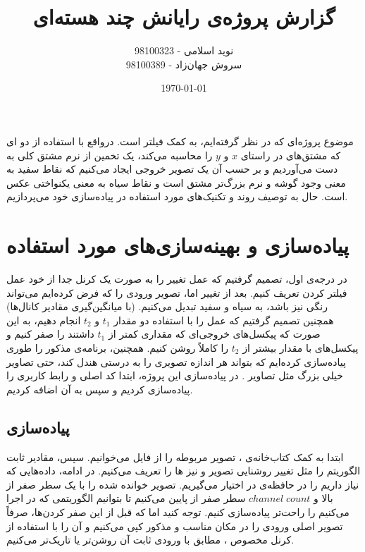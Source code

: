 \documentclass[12pt,onecolumn,a4paper]{article}
\begin{document}
\begin{titlepage}
\title{گزارش پروژه‌ی رایانش چند هسته‌ای \\ } 
\author{نوید اسلامی - 98100323 \\ سروش جهان‌زاد - 98100389}
\date{\today}
\maketitle
\end{titlepage}

موضوع پروژه‌ای که در نظر گرفته‌ایم،  به کمک فیلتر  است. درواقع با استفاده از دو ای که مشتق‌های در راستای $x$ و $y$ را محاسبه می‌کند، یک تخمین از نرم مشتق کلی به دست می‌آوردیم و بر حسب آن یک تصویر خروجی ایجاد می‌کنیم که نقاط سفید به معنی وجود گوشه و نرم بزرگ‌تر مشتق است و نقاط سیاه به معنی یکنواختی عکس است. حال به توصیف روند و تکنیک‌های مورد استفاده در پیاده‌سازی خود می‌پردازیم.

\section{پیاده‌سازی و بهینه‌سازی‌های مورد استفاده}
در درجه‌ی اول، تصمیم گرفتیم که عمل تغییر  را به صورت یک کرنل جدا از خود عمل فیلتر کردن تعریف کنیم. بعد از تغییر  اما، تصویر ورودی را که فرض کرده‌ایم می‌تواند رنگی نیز باشد، به سیاه و سفید تبدیل می‌کنیم. (با میانگین‌گیری مقادیر کانال‌ها) همچنین تصمیم گرفتیم که عمل  را با استفاده دو مقدار  $t_1$ و $t_2$ انجام دهیم، به این صورت که پیکسل‌های خروجی‌ای که مقداری کمتر از $t_1$ داشتند را صفر کنیم و پیکسل‌های با مقدار بیشتر از $t_2$ را کاملاً روشن کنیم. همچنین، برنامه‌ی مذکور را طوری پیاده‌سازی کرده‌ایم که بتواند هر اندازه تصویری را به درستی هندل کند، حتی تصاویر خیلی بزرگ مثل تصاویر . در پیاده‌سازی این پروژه، ابتدا کد اصلی و رابط کاربری  را پیاده‌سازی کردیم و سپس به آن  اضافه کردیم.

\subsection{پیاده‌سازی }
ابتدا به کمک کتاب‌خانه‌ی ، تصویر مربوطه را از فایل می‌خوانیم. سپس، مقادیر ثابت الگوریتم را مثل تغییر روشنایی تصویر و نیز ها را تعریف می‌کنیم. در ادامه، داده‌هایی که نیاز داریم را در حافظه‌ی  در اختیار می‌گیریم. تصویر خوانده شده را با یک سطر صفر از بالا و $channel \; count$ سطر صفر از پایین  می‌کنیم تا بتوانیم الگوریتمی که در  اجرا می‌کنیم را راحت‌تر پیاده‌سازی کنیم. توجه کنید اما که قبل از این صفر کردن‌ها، صرفاً تصویر اصلی ورودی را در مکان مناسب و مذکور کپی می‌کنیم و آن را با استفاده از کرنل مخصوص ، مطابق با ورودی ثابت آن روشن‌تر یا تاریک‌تر می‌کنیم.
\end{document}
